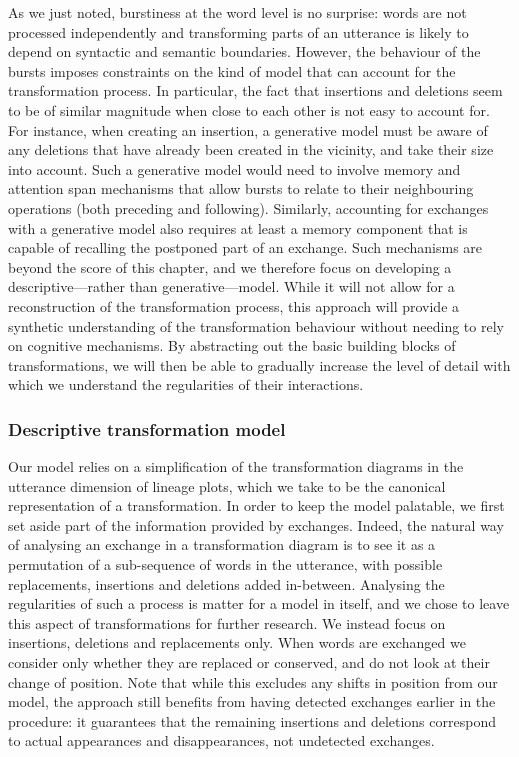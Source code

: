 As we just noted, burstiness at the word level is no surprise: words are
not processed independently and transforming parts of an utterance is
likely to depend on syntactic and semantic boundaries. However, the
behaviour of the bursts imposes constraints on the kind of model that
can account for the transformation process. In particular, the fact that
insertions and deletions seem to be of similar magnitude when close to
each other is not easy to account for. For instance, when creating an
insertion, a generative model must be aware of any deletions that have
already been created in the vicinity, and take their size into account.
Such a generative model would need to involve memory and attention span
mechanisms that allow bursts to relate to their neighbouring operations
(both preceding and following). Similarly, accounting for exchanges with
a generative model also requires at least a memory component that is
capable of recalling the postponed part of an exchange. Such mechanisms
are beyond the score of this chapter, and we therefore focus on
developing a descriptive---rather than generative---model. While it will
not allow for a reconstruction of the transformation process, this
approach will provide a synthetic understanding of the transformation
behaviour without needing to rely on cognitive mechanisms. By
abstracting out the basic building blocks of transformations, we will
then be able to gradually increase the level of detail with which we
understand the regularities of their interactions.

\subsubsection{Descriptive transformation
model}\label{descriptive-transformation-model}

Our model relies on a simplification of the transformation diagrams in
the utterance dimension of lineage plots, which we take to be the
canonical representation of a transformation. In order to keep the model
palatable, we first set aside part of the information provided by
exchanges. Indeed, the natural way of analysing an exchange in a
transformation diagram is to see it as a permutation of a sub-sequence
of words in the utterance, with possible replacements, insertions and
deletions added in-between. Analysing the regularities of such a process
is matter for a model in itself, and we chose to leave this aspect of
transformations for further research. We instead focus on insertions,
deletions and replacements only. When words are exchanged we consider
only whether they are replaced or conserved, and do not look at their
change of position. Note that while this excludes any shifts in position
from our model, the approach still benefits from having detected
exchanges earlier in the procedure: it guarantees that the remaining
insertions and deletions correspond to actual appearances and
disappearances, not undetected exchanges.

